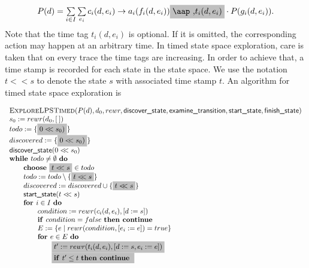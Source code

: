 \documentclass{article}
\newcommand{\at}[1]{\mbox{\aap ,} #1}
\newcommand{\aftertime}{\ensuremath{<\!\!<}}
\newcommand{\Space}{\text{\ }}
\newcommand{\If}{\text{\textbf{if }}}
\newcommand{\Do}{\text{\textbf{do }}}
\newcommand{\Then}{\text{\textbf{then }}}
\newcommand{\For}{\text{\textbf{for }}}
\newcommand{\While}{\text{\textbf{while }}}
\newcommand{\Continue}{\text{\textbf{continue }}}
\newcommand{\Choose}{\text{\textbf{choose }}}
\begin{document}
\[
\begin{array}{l}
P(d)=
\sum\limits_{i\in I}\sum\limits_{e_i}c_i(d, e_i)\rightarrow a_i(f_i(d,e_i))
\colorbox{lightgray}{$\at t_i(d,e_i)$}
\cdot P(g_i(d,e_i)).
\end{array}
\]
Note that the time tag $t_i(d,e_i)$ is optional. If it is omitted, the corresponding action may happen at an arbitrary time. In timed state space exploration, care is taken that on every trace the time tags are
increasing. In order to achieve that, a time stamp is recorded for each state
in the state space. We use the notation $t \aftertime s$ to denote the state $s$
with associated time stamp $t$.
An algorithm for timed state space exploration is 

\[
\begin{tabular}{l}
\textsc{ExploreLPSTimed}($P(d), d_0, rewr, \textsf{discover\_state}, \textsf{examine\_transition},
\textsf{start\_state}, \textsf{finish\_state})$ \\
$s_0 := rewr(d_0, [\:])$ \\
$todo := \{\colorbox{lightgray}{$0 \aftertime s_0)$}\}$ \\
$discovered := \{ \colorbox{lightgray}{$0 \aftertime s_0)$} \}$ \\
$\textsf{discover\_state}(0 \aftertime s_0)$ \\
$\While todo \neq \emptyset \Space \Do$ \\
\qquad \Choose \colorbox{lightgray}{$t \aftertime s$} $\in todo$ \\
\qquad $todo := todo \setminus \{ \colorbox{lightgray}{$t \aftertime s$} \}$ \\
\qquad $discovered := discovered \cup \{ \colorbox{lightgray}{$t \aftertime s$} \}$ \\
\qquad $\textsf{start\_state}(t \aftertime s)$ \\
\qquad $\For i \in I  \Space \Do$ \\
\qquad \qquad $condition := rewr(c_i(d, e_i), [d := s])$ \\
\qquad \qquad $\If condition = false  \Space \Then \Continue$ \\
\qquad \qquad $E := \{ e \mid rewr(condition, [e_i := e]) = true \}$ \\
\qquad \qquad $\For e \in E  \Space \Do$ \\
\qquad \qquad \qquad \colorbox{lightgray}{$t' := rewr(t_i(d,e_i), [d:=s,e_i:=e])$} \\
\qquad \qquad \qquad \colorbox{lightgray}{$\If t' \leq t \Space \Then \Continue$} \\

\end{tabular}\]
\end{document}
